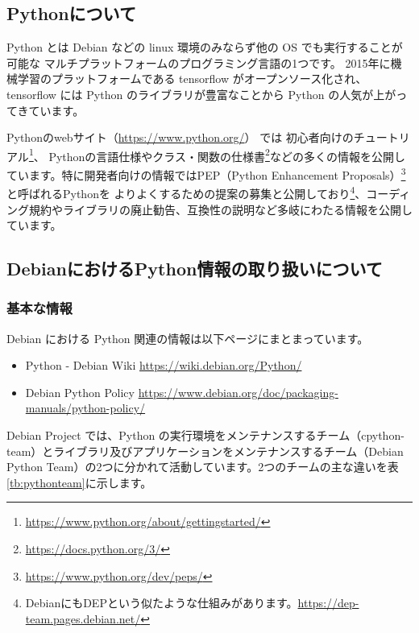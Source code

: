 \documentclass[mingoth,a4paper]{jsarticle}
\begin{document}
\subsection{Pythonについて}

Python とは Debian などの linux 環境のみならず他の OS でも実行することが可能な
マルチプラットフォームのプログラミング言語の1つです。
2015年に機械学習のプラットフォームである tensorflow がオープンソース化され、 tensorflow には Python のライブラリが豊富なことから Python の人気が上がってきています。

Pythonのwebサイト（\url{https://www.python.org/}） では
初心者向けのチュートリアル\footnote{\url{https://www.python.org/about/gettingstarted/}}、
Pythonの言語仕様やクラス・関数の仕様書\footnote{\url{https://docs.python.org/3/}}などの多くの情報を公開しています。特に開発者向けの情報ではPEP（Python Enhancement Proposals）\footnote{\url{https://www.python.org/dev/peps/}}と呼ばれるPythonを
よりよくするための提案の募集と公開しており\footnote{DebianにもDEPという似たような仕組みがあります。\url{https://dep-team.pages.debian.net/}}、コーディング規約やライブラリの廃止勧告、互換性の説明など多岐にわたる情報を公開しています。


\subsection{DebianにおけるPython情報の取り扱いについて}

\subsubsection{基本な情報}

Debian における Python 関連の情報は以下ページにまとまっています。

\begin{itemize}
\item Python - Debian Wiki \url{https://wiki.debian.org/Python/}
\item Debian Python Policy \url{https://www.debian.org/doc/packaging-manuals/python-policy/}
\end{itemize}

Debian Project では、Python の実行環境をメンテナンスするチーム（cpython-team）とライブラリ及びアプリケーションをメンテナンスするチーム（Debian Python Team）の2つに分かれて活動しています。2つのチームの主な違いを表\ref{tb:pythonteam}に示します。
\end{document}
